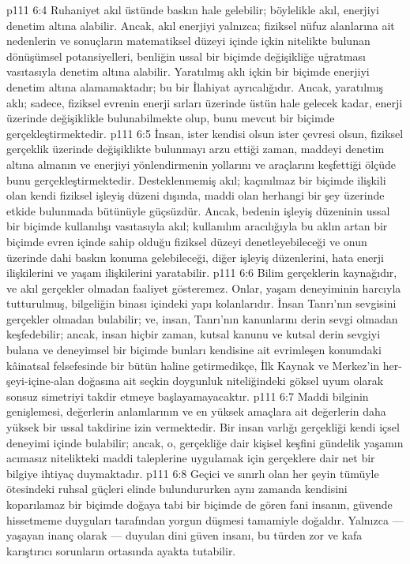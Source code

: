 \vs p111 6:4 Ruhaniyet akıl üstünde baskın hale gelebilir; böylelikle akıl, enerjiyi denetim altına alabilir. Ancak, akıl enerjiyi yalnızca; fiziksel nüfuz alanlarına ait nedenlerin ve sonuçların matematiksel düzeyi içinde içkin nitelikte bulunan dönüşümsel potansiyelleri, benliğin ussal bir biçimde değişikliğe uğratması vasıtasıyla denetim altına alabilir. Yaratılmış aklı içkin bir biçimde enerjiyi denetim altına alamamaktadır; bu bir İlahiyat ayrıcalığıdır. Ancak, yaratılmış aklı; sadece, fiziksel evrenin enerji sırları üzerinde üstün hale gelecek kadar, enerji üzerinde değişiklikle bulunabilmekte olup, bunu mevcut bir biçimde gerçekleştirmektedir.
\vs p111 6:5 İnsan, ister kendisi olsun ister çevresi olsun, fiziksel gerçeklik üzerinde değişiklikte bulunmayı arzu ettiği zaman, maddeyi denetim altına almanın ve enerjiyi yönlendirmenin yollarını ve araçlarını keşfettiği ölçüde bunu gerçekleştirmektedir. Desteklenmemiş akıl; kaçınılmaz bir biçimde ilişkili olan kendi fiziksel işleyiş düzeni dışında, maddi olan herhangi bir şey üzerinde etkide bulunmada bütünüyle güçsüzdür. Ancak, bedenin işleyiş düzeninin ussal bir biçimde kullanılışı vasıtasıyla akıl; kullanılım aracılığıyla bu aklın artan bir biçimde evren içinde sahip olduğu fiziksel düzeyi denetleyebileceği ve onun üzerinde dahi baskın konuma gelebileceği, diğer işleyiş düzenlerini, hata enerji ilişkilerini ve yaşam ilişkilerini yaratabilir.
\vs p111 6:6 Bilim gerçeklerin kaynağıdır, ve akıl gerçekler olmadan faaliyet gösteremez. Onlar, yaşam deneyiminin harcıyla tutturulmuş, bilgeliğin binası içindeki yapı kolanlarıdır. İnsan Tanrı’nın sevgisini gerçekler olmadan bulabilir; ve, insan, Tanrı’nın kanunlarını derin sevgi olmadan keşfedebilir; ancak, insan hiçbir zaman, kutsal kanunu ve kutsal derin sevgiyi bulana ve deneyimsel bir biçimde bunları kendisine ait evrimleşen konumdaki kâinatsal felsefesinde bir bütün haline getirmedikçe, İlk Kaynak ve Merkez’in her\hyp{}şeyi\hyp{}içine\hyp{}alan doğasına ait seçkin doygunluk niteliğindeki göksel uyum olarak sonsuz simetriyi takdir etmeye başlayamayacaktır.
\vs p111 6:7 Maddi bilginin genişlemesi, değerlerin anlamlarının ve en yüksek amaçlara ait değerlerin daha yüksek bir ussal takdirine izin vermektedir. Bir insan varlığı gerçekliği kendi içsel deneyimi içinde bulabilir; ancak, o, gerçekliğe dair kişisel keşfini gündelik yaşamın acımasız nitelikteki maddi taleplerine uygulamak için gerçeklere dair net bir bilgiye ihtiyaç duymaktadır.
\vs p111 6:8 Geçici ve sınırlı olan her şeyin tümüyle ötesindeki ruhsal güçleri elinde bulundururken aynı zamanda kendisini koparılamaz bir biçimde doğaya tabi bir biçimde de gören fani insanın, güvende hissetmeme duyguları tarafından yorgun düşmesi tamamiyle doğaldır. Yalnızca --- yaşayan inanç olarak --- duyulan dini güven insanı, bu türden zor ve kafa karıştırıcı sorunların ortasında ayakta tutabilir.
